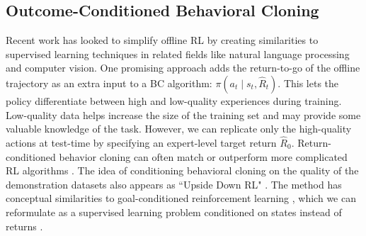 


\subsection{Outcome-Conditioned Behavioral Cloning}
Recent work has looked to simplify offline RL by creating similarities to supervised learning techniques in related fields like natural language processing and computer vision. One promising approach adds the return-to-go of the offline trajectory as an extra input to a BC algorithm: $\pi(a_t \mid s_t, \hat{R}_t)$. This lets the policy differentiate between high and low-quality experiences during training. Low-quality data helps increase the size of the training set and may provide some valuable knowledge of the task. However, we can replicate only the high-quality actions at test-time by specifying an expert-level target return $\hat{R}_0$. Return-conditioned behavior cloning can often match or outperform more complicated RL algorithms \cite{rvs, rcp, brandfonbrener2022does}. The idea of conditioning behavioral cloning on the quality of the demonstration datasets also appears as ``Upside Down RL" \cite{udrl_idea, udrl_implementation}. The method has conceptual similarities to goal-conditioned reinforcement learning \cite{nair2018visual, andrychowicz2017hindsight}, which we can reformulate as a supervised learning problem conditioned on states instead of returns \cite{eysenbach2022imitating, ghosh2019learning}.

